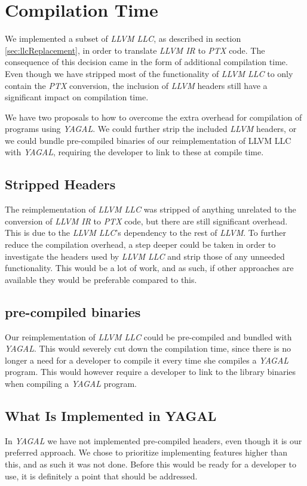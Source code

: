 \section{Compilation Time}

We implemented a subset of \textit{LLVM LLC}, as described in section \ref{sec:llcReplacement}, in order to translate \textit{LLVM IR} to \textit{PTX} code. The consequence of this decision came in the form of additional compilation time. Even though we have stripped most of the functionality of \textit{LLVM LLC} to only contain the \textit{PTX} conversion, the inclusion of \textit{LLVM} headers still have a significant impact on compilation time.

We have two proposals to how to overcome the extra overhead for compilation of programs using \textit{YAGAL}. We could further strip the included \textit{LLVM} headers, or we could bundle pre-compiled binaries of our reimplementation of {LLVM LLC} with \textit{YAGAL}, requiring the developer to link to these at compile time.

\subsection{Stripped Headers}
The reimplementation of \textit{LLVM LLC} was stripped of anything unrelated to the conversion of \textit{LLVM IR} to \textit{PTX} code, but there are still significant overhead. This is due to the \textit{LLVM LLC}'s dependency to the rest of \textit{LLVM}. To further reduce the compilation overhead, a step deeper could be taken in order to investigate the headers used by \textit{LLVM LLC} and strip those of any unneeded functionality. This would be a lot of work, and as such, if other approaches are available they would be preferable compared to this.


\subsection{pre-compiled binaries}
Our reimplementation of \textit{LLVM LLC} could be pre-compiled and bundled with \textit{YAGAL}. This would severely cut down the compilation time, since there is no longer a need for a developer to compile it every time she compiles a \textit{YAGAL} program. This would however require a developer to link to the library binaries when compiling a \textit{YAGAL} program.

\subsection{What Is Implemented in YAGAL}
In \textit{YAGAL} we have not implemented pre-compiled headers, even though it is our preferred approach. We chose to prioritize implementing features higher than this, and as such it was not done. Before this would be ready for a developer to use, it is definitely a point that should be addressed.